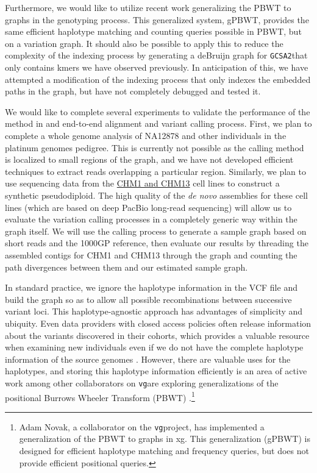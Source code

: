 \documentclass[12pt]{article}
\newcommand{\vg}{{\tt vg}}
\newcommand{\gcsa}{{\tt GCSA2}}
\begin{document}
Furthermore, we would like to utilize recent work generalizing the PBWT to graphs in the genotyping process.
This generalized system, gPBWT, provides the same efficient haplotype matching and counting queries possible in PBWT, but on a variation graph.
It should also be possible to apply this to reduce the complexity of the indexing process by generating a deBruijn graph for \gcsa that only contains kmers we have observed previously.
In anticipation of this, we have attempted a modification of the indexing process that only indexes the embedded paths in the graph, but have not completely debugged and tested it.

We would like to complete several experiments to validate the performance of the method in and end-to-end alignment and variant calling process.
First, we plan to complete a whole genome analysis of NA12878 and other individuals in the platinum genomes pedigree.
This is currently not possible as the calling method is localized to small regions of the graph, and we have not developed efficient techniques to extract reads overlapping a particular region.
Similarly, we plan to use sequencing data from the \href{http://www.ncbi.nlm.nih.gov/assembly/706168/}{CHM1 and CHM13} cell lines to construct a synthetic pseudodiploid.
The high quality of the \emph{de novo} assemblies for these cell lines (which are based on deep PacBio long-read sequencing) will allow us to evaluate the variation calling processes in a completely generic way within the graph itself.
We will use the calling process to generate a sample graph based on short reads and the 1000GP reference, then evaluate our results by threading the assembled contigs for CHM1 and CHM13 through the graph and counting the path divergences between them and our estimated sample graph.

In standard practice, we ignore the haplotype information in the VCF file and build the graph so as to allow all possible recombinations between successive variant loci.
This haplotype-agnostic approach has advantages of simplicity and ubiquity.
Even data providers with closed access policies often release information about the variants discovered in their cohorts, which provides a valuable resource when examining new individuals even if we do not have the complete haplotype information of the source genomes \cite{exac2015}.
However, there are valuable uses for the haplotypes, and storing this haplotype information efficiently is an area of active work among other collaborators on \vg are exploring generalizations of the positional Burrows Wheeler Transform (PBWT) \cite{durbin2014}.\footnote{Adam Novak, a collaborator on the \vg project, has implemented a generalization of the PBWT to graphs in xg. This generalization (gPBWT) is designed for efficient haplotype matching and frequency queries, but does not provide efficient positional queries.}
\end{document}
